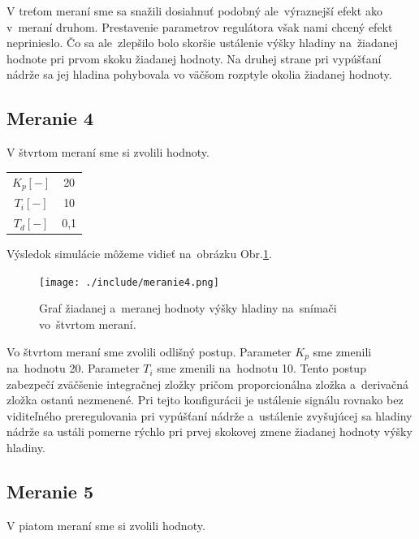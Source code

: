 \documentclass{article}
\begin{document}
V treťom meraní sme sa snažili dosiahnuť podobný ale~výraznejší efekt ako v~meraní druhom. Prestavenie
parametrov regulátora však nami chcený efekt neprinieslo. Čo sa ale~zlepšilo bolo skoršie ustálenie výšky
hladiny na~žiadanej hodnote pri prvom skoku žiadanej hodnoty. Na druhej strane pri vypúšťaní nádrže sa jej
hladina pohybovala vo väčšom rozptyle okolia žiadanej hodnoty.

\clearpage

\subsection{Meranie 4}
\label{sec:meranie4}

V štvrtom meraní sme si zvolili hodnoty. 

\begin{center}
\begin{tabular}{ |c|c| }
 \hline
 $K_p [-]$ & 20 \\
 $T_i [-]$ & 10 \\
 $T_d [-]$ & 0,1 \\
 \hline
\end{tabular}
\end{center}

Výsledok simulácie môžeme vidieť na~obrázku Obr.\ref{fig:m4}.

\begin{figure}[!htbp]
	\begin{center}
		\texttt{[image: ./include/meranie4.png]}
	\end{center}
	\caption{Graf žiadanej a~meranej hodnoty výšky hladiny na~snímači vo~štvrtom meraní.}
	\label{fig:m4}
\end{figure}

Vo štvrtom meraní sme zvolili odlišný postup. Parameter $K_p$ sme zmenili na~hodnotu 20. Parameter $T_i$
sme zmenili na~hodnotu 10. Tento postup zabezpečí zväčšenie integračnej zložky pričom proporcionálna
zložka a~derivačná zložka ostanú nezmenené. Pri tejto konfigurácii je ustálenie signálu rovnako
bez viditeľného preregulovania pri vypúšťaní nádrže a~ustálenie zvyšujúcej sa hladiny nádrže sa ustáli
pomerne rýchlo pri prvej skokovej zmene žiadanej hodnoty výšky hladiny.

\clearpage

\subsection{Meranie 5}
\label{sec:meranie5}

V piatom meraní sme si zvolili hodnoty. 
\end{document}
